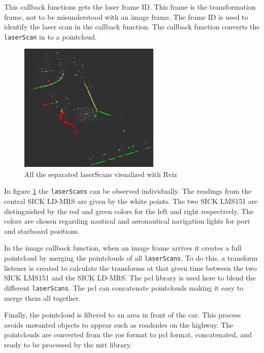 This callback functions gets the laser frame ID. This frame is the transformation frame, not to be misunderstood with an image frame. The frame ID is used to identify the laser scan in the callback function. The callback function converts the \texttt{laserScan} in to a pointcloud.

\begin{figure}[htp]
	
	\centering
	\includegraphics[width=0.6\textwidth]{caplabel/imgs/rviz0.png}
	
	\caption{All the separated laserScans visualized with Rviz}
	\label{fig:rviz0}
	
\end{figure}

In figure \ref{fig:rviz0} the \texttt{laserScans} can be observed individually. The readings from the central SICK LD-MRS are given by the white points. The two SICK LMS151 are distinguished by the red and green colors for the left and right respectively. The colors are chosen regarding nautical and aeronautical navigation lights for port and starboard positions.

In the image callback function, when an image frame arrives it creates a full pointcloud by merging the pointclouds of all \texttt{laserScans}. To do this, a transform listener is created to calculate the transforms at that given time between the two SICK LMS151 and the SICK LD-MRS. The \gls{pcl} library is used here to blend the different \texttt{laserScans}. The \gls{pcl} can concatenate pointclouds making it easy to merge them all together.

Finally, the pointcloud is filtered to an area in front of the car. This process avoids unwanted objects to appear such as roadsides on the highway. The pointclouds are converted from the \gls{ros} format to \gls{pcl} format, concatenated, and ready to be processed by the \gls{mtt} library. 

